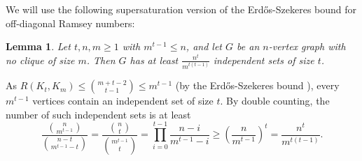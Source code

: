 \documentclass[11pt]{article}
\let\oldendproof\endproof
\renewenvironment{proof}[1][\proofname]{%
	\oldproof[\bf #1]%
}{\oldendproof}
\theoremstyle{plain}
\newtheorem{lemma}[theorem]{Lemma}
\begin{document}
We will use the following supersaturation version of the Erd\H{o}s-Szekeres bound \cite{ES} for off-diagonal Ramsey numbers:
 
\begin{lemma}\label{lem:Ramsey supersaturation}
	Let $t,n,m \geq 1$ with $m^{t-1} \leq n$, and let $G$ be an $n$-vertex graph with no clique of size $m$. Then $G$ has at least $\frac{n^t}{m^{t(t-1)}}$ independent sets of size $t$.
\end{lemma}
\begin{proof}
	As $R(K_t,K_m) \leq \binom{m+t-2}{t-1} \leq m^{t-1}$ (by the Erd\H{o}s-Szekeres bound \cite{ES}), every $m^{t-1}$ vertices contain an independent set of size $t$. By double counting, the number of such independent sets \nolinebreak is \nolinebreak at \nolinebreak least
	$$
	\frac{\binom{n}{m^{t-1}}}{\binom{n-t}{m^{t-1}-t}} = \frac{\binom{n}{t}}{\binom{m^{t-1}}{t}} = \prod_{i=0}^{t-1} \frac{n-i}{m^{t-1}-i} \geq \left( \frac{n}{m^{t-1}} \right)^t = \frac{n^t}{m^{t(t-1)}}.
	$$
\end{proof}
\end{document}

